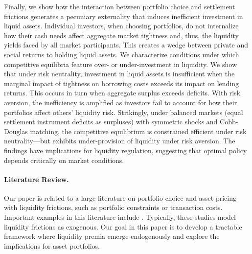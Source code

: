 \documentclass[12pt,american,english,notitlepage]{article}
\begin{document}
Finally, we show how the interaction between portfolio choice and settlement frictions generates a pecuniary externality that induces inefficient investment in liquid assets.
Individual investors, when choosing portfolios, do not internalize
how their cash needs affect aggregate market tightness and, thus, the liquidity yields faced by all market participants. This creates
a wedge between private and social returns to holding liquid assets.
We characterize conditions under which competitive equilibria feature
over- or under-investment in liquidity. We show that under risk neutrality, investment in liquid assets is insufficient when the marginal impact of tightness on borrowing costs exceeds its impact on lending returns. This occurs in turn when aggregate surplus exceeds deficits. With risk aversion, the inefficiency is amplified as investors fail to account
for how their portfolios affect others' liquidity risk. Strikingly,
under balanced markets (equal settlement instrument deficits as surpluses) with symmetric shocks and Cobb-Douglas matching, the competitive equilibrium
is constrained efficient under risk neutrality---but exhibits under-provision
of liquidity under risk aversion. The findings have implications for liquidity regulation, suggesting that optimal policy depends critically on market conditions.

\paragraph{Literature Review. }

Our paper is related to a large literature on portfolio choice and
asset pricing with liquidity frictions, such as portfolio constraints
or transaction costs. Important examples in this literature include
\cite{Constantinides1986,Basak1998,Vayanos1999,constanidesduffie1996,KruegerLustig2010,Holmstrom2001,acharya2005asset,lagos2010asset}.
Typically, these studies model liquidity frictions as exogenous. Our goal in this paper is to develop a tractable framework where liquidity
premia emerge endogenously and explore the implications for asset
portfolios.
\end{document}
